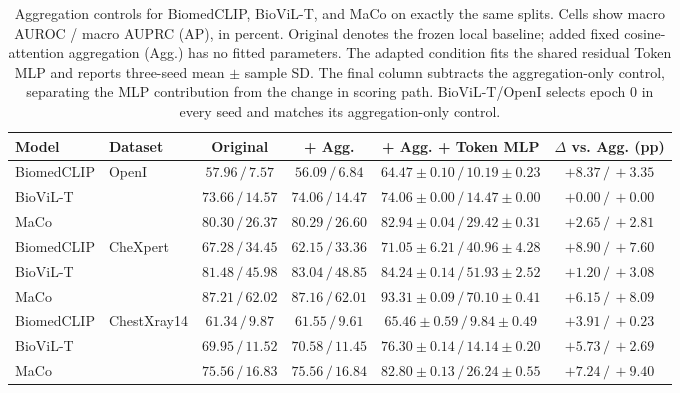 \begin{table}[t]
\centering
\footnotesize
\setlength{\tabcolsep}{5pt}
\begin{tabular}{@{}llcccc@{}}
\toprule
Model & Dataset & Original & + Agg. & + Agg. + Token MLP & $\Delta$ vs. Agg. (pp) \\
\midrule
BiomedCLIP & \multirow{3}{*}{OpenI} & $57.96\,/\,7.57$ & $56.09\,/\,6.84$ & $64.47\pm0.10\,/\,10.19\pm0.23$ & $+8.37\,/\,+3.35$ \\
BioViL-T &  & $73.66\,/\,14.57$ & $74.06\,/\,14.47$ & $74.06\pm0.00\,/\,14.47\pm0.00$ & $+0.00\,/\,+0.00$ \\
MaCo &  & $80.30\,/\,26.37$ & $80.29\,/\,26.60$ & $82.94\pm0.04\,/\,29.42\pm0.31$ & $+2.65\,/\,+2.81$ \\
\midrule
BiomedCLIP & \multirow{3}{*}{CheXpert} & $67.28\,/\,34.45$ & $62.15\,/\,33.36$ & $71.05\pm6.21\,/\,40.96\pm4.28$ & $+8.90\,/\,+7.60$ \\
BioViL-T &  & $81.48\,/\,45.98$ & $83.04\,/\,48.85$ & $84.24\pm0.14\,/\,51.93\pm2.52$ & $+1.20\,/\,+3.08$ \\
MaCo &  & $87.21\,/\,62.02$ & $87.16\,/\,62.01$ & $93.31\pm0.09\,/\,70.10\pm0.41$ & $+6.15\,/\,+8.09$ \\
\midrule
BiomedCLIP & \multirow{3}{*}{ChestXray14} & $61.34\,/\,9.87$ & $61.55\,/\,9.61$ & $65.46\pm0.59\,/\,9.84\pm0.49$ & $+3.91\,/\,+0.23$ \\
BioViL-T &  & $69.95\,/\,11.52$ & $70.58\,/\,11.45$ & $76.30\pm0.14\,/\,14.14\pm0.20$ & $+5.73\,/\,+2.69$ \\
MaCo &  & $75.56\,/\,16.83$ & $75.56\,/\,16.84$ & $82.80\pm0.13\,/\,26.24\pm0.55$ & $+7.24\,/\,+9.40$ \\
\bottomrule
\end{tabular}
\caption{Aggregation controls for BiomedCLIP, BioViL-T, and MaCo on exactly the same splits. Cells show macro AUROC / macro AUPRC (AP), in percent. Original denotes the frozen local baseline; added fixed cosine-attention aggregation (Agg.) has no fitted parameters. The adapted condition fits the shared residual Token MLP and reports three-seed mean $\pm$ sample SD. The final column subtracts the aggregation-only control, separating the MLP contribution from the change in scoring path. BioViL-T/OpenI selects epoch 0 in every seed and matches its aggregation-only control.}
\label{tab:token_mlp_aggregation_control}
\end{table}
